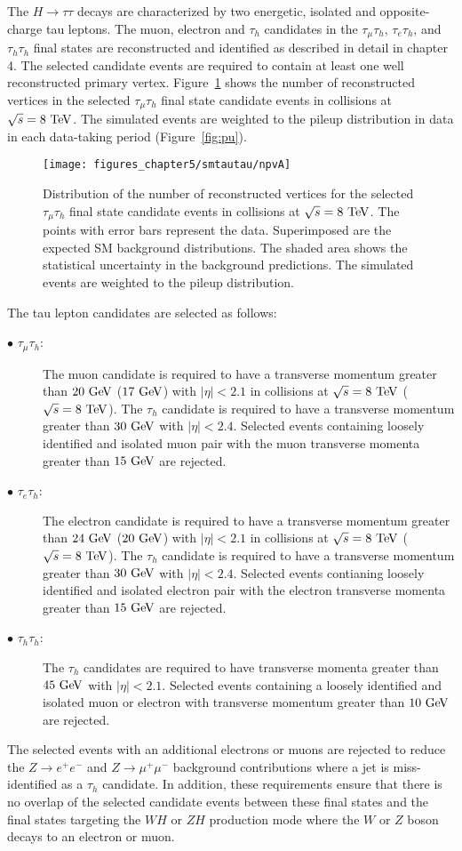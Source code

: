The $H \rightarrow \tau\tau$ decays are characterized by two energetic, isolated and opposite-charge tau leptons. The muon, electron and $\tau_h$ candidates in the  $\tau_{\mu}\tau_{h}$, $\tau_{e}\tau_{h}$, and $\tau_{h}\tau_{h}$  final states are reconstructed and identified as described in detail in chapter 4.  The selected candidate events are required to contain at least one well reconstructed primary vertex. Figure~\ref{fig:npv} shows the number of reconstructed vertices in the selected $\tau_{\mu}\tau_{h}$ final state candidate events in collisions at $\sqrt{s}=8~\mathrm{Te\kern -0.1em V}$. The simulated events are weighted to the pileup distribution in data in each data-taking period (Figure~\ref{fig:pu}). 
\begin{figure}[htbp]
\centering
\texttt{[image: figures\_chapter5/smtautau/npvA]}
\caption{Distribution of the number of reconstructed vertices for the selected $\tau_{\mu}\tau_{h}$ final state candidate events in collisions at $\sqrt{s}=8~\mathrm{Te\kern -0.1em V}$. The points with error bars represent the data. Superimposed are the expected SM background distributions. The shaded area shows the statistical uncertainty in the background predictions. The simulated events are weighted to the pileup distribution.}
\label{fig:npv}
\end{figure}
The tau lepton candidates are selected as follows:
\begin{description}
\item[$\bullet$ $\tau_{\mu}\tau_h$:] The muon candidate is required to have a transverse momentum greater than  $20~\mathrm{Ge\kern -0.1em V}$ ($17~\mathrm{Ge\kern -0.1em V}$) with $|\eta|<2.1$ in collisions at $\sqrt{s}=8~\mathrm{Te\kern -0.1em V}$ ($\sqrt{s}=8~\mathrm{Te\kern -0.1em V}$). The $\tau_h$ candidate is required to have a transverse momentum greater than $30~\mathrm{Ge\kern -0.1em V}$ with $|\eta|<2.4$. Selected events containing loosely identified and isolated muon pair with the muon transverse momenta greater than $15~\mathrm{Ge\kern -0.1em V}$ are rejected. 
\item[$\bullet$ $\tau_{e}\tau_h$:] The electron candidate is required to have a transverse momentum greater than  $24~\mathrm{Ge\kern -0.1em V}$ ($20~\mathrm{Ge\kern -0.1em V}$) with $|\eta|<2.1$ in collisions at $\sqrt{s}=8~\mathrm{Te\kern -0.1em V}$ ($\sqrt{s}=8~\mathrm{Te\kern -0.1em V}$). The $\tau_h$ candidate is required to have a transverse momentum greater than $30~\mathrm{Ge\kern -0.1em V}$ with $|\eta|<2.4$. Selected events contianing loosely identified and isolated electron pair with the electron transverse momenta greater than $15~\mathrm{Ge\kern -0.1em V}$ are rejected. 
\item[$\bullet$ $\tau_{h}\tau_h$:] The $\tau_h$ candidates are required to have transverse momenta greater than $45~\mathrm{Ge\kern -0.1em V}$ with $|\eta|<2.1$. Selected events containing a loosely identified and isolated muon or electron with transverse momentum greater than $10~\mathrm{Ge\kern -0.1em V}$ are rejected. 
\end{description}    
The selected events with an additional electrons or muons are rejected to reduce the $Z \rightarrow e^+e^-$ and $Z \rightarrow \mu^+\mu^-$ background contributions where a jet is miss-identified as a $\tau_h$ candidate. In addition, these requirements ensure that there is no overlap of the selected candidate events between these final states and the final states targeting the $WH$ or $ZH$ production mode where the $W$ or $Z$ boson decays to an electron or muon.   

